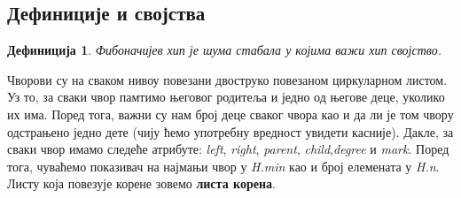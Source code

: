 \documentclass[11pt, a4paper]{article}
\newtheorem{definicija}{\selectlanguage{russian} Дефиниција} [subsection]
\theoremstyle{remark}
\numberwithin{equation}{section}
\begin{document}
	\subsection{Дефиниције и својства}
	
	\begin{definicija}
		\normalfont
		Фибоначијев хип је шума стабала у којима важи хип својство.
	\end{definicija}
	
	\noindent Чворови су на сваком нивоу повезани двоструко повезаном циркуларном листом. Уз то, за сваки чвор памтимо његовог родитеља и једно од његове деце, уколико их има. Поред тога, важни су нам број деце сваког чвора као и да ли је том чвору одстрањено једно дете (чију ћемо употребну вредност увидети касније). Дакле, за сваки чвор имамо следеће атрибуте: \textit{left}, \textit{right}, \textit{parent}, \textit{child},\textit{degree} и \textit{mark}. Поред тога, чуваћемо показивач на најмањи чвор у \textit{H.min} као и број елемената у \textit{H.n}. Листу која повезује корене зовемо \textbf{листа корена}. \\
	
\end{document}

